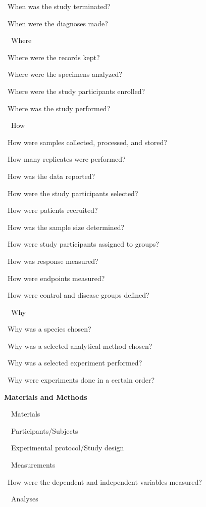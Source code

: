 \documentclass[a4paper, 12pt]{article}
\begin{document}
\par\quad\textopenbullet\ When was the study terminated?
\par\quad\textopenbullet\ When were the diagnoses made?
\par\ \textbullet\ Where
\par\quad\textopenbullet\ Where were the records kept?
\par\quad\textopenbullet\ Where were the specimens analyzed?
\par\quad\textopenbullet\ Where were the study participants enrolled?
\par\quad\textopenbullet\ Where was the study performed?
\par\ \textbullet\ How
\par\quad\textopenbullet\ How were samples collected, processed, and stored?
\par\quad\textopenbullet\ How many replicates were performed?
\par\quad\textopenbullet\ How was the data reported?
\par\quad\textopenbullet\ How were the study participants selected?
\par\quad\textopenbullet\ How were patients recruited?
\par\quad\textopenbullet\ How was the sample size determined?
\par\quad\textopenbullet\ How were study participants assigned to groups?
\par\quad\textopenbullet\ How was response measured?
\par\quad\textopenbullet\ How were endpoints measured?
\par\quad\textopenbullet\ How were control and disease groups defined?
\par\ \textbullet\ Why
\par\quad\textopenbullet\ Why was a species chosen?
\par\quad\textopenbullet\ Why was a selected analytical method chosen?
\par\quad\textopenbullet\ Why was a selected experiment performed?
\par\quad\textopenbullet\ Why were experiments done in a certain order?

\newpage\textbf{Materials and Methods}
\par\ \textbullet\ Materials
\par\ \textbullet\ Participants/Subjects
\par\ \textbullet\ Experimental protocol/Study design
\par\ \textbullet\ Measurements
\par\quad\textopenbullet\ How were the dependent and independent variables measured?
\par\ \textbullet\ Analyses
\end{document}
